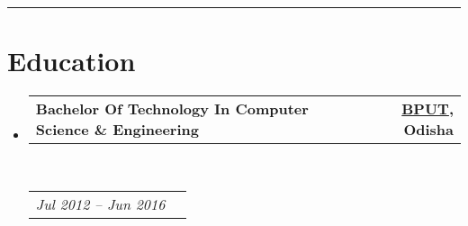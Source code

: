 \documentclass[10pt,a4paper,hidelinks]{article}
\makeatletter
\newcommand{\headerrow}[2]
{\begin{tabular*}{\linewidth}{l@{\extracolsep{\fill}}r}
	#1 &
	#2 \\
\end{tabular*}}
\makeatother
\begin{document}



{\color{IFLightBlue} \hrule}
\vspace{-0.3em}
{\color{IFMediumBlue}\section*{Education}}

\begin{itemize}
	\parskip=0.1em

	\item 
	\headerrow
		{\textbf{Bachelor Of Technology In Computer Science \& Engineering}}
		{\textbf{\colorbox{IFLightBlue!10}{\href{http://www.bput.ac.in}{{BPUT}}}{, Odisha}}}
	\\
	\headerrow
		{\emph{Jul 2012 -- Jun 2016}}
		{\emph{}}

\end{itemize}
\end{document}
